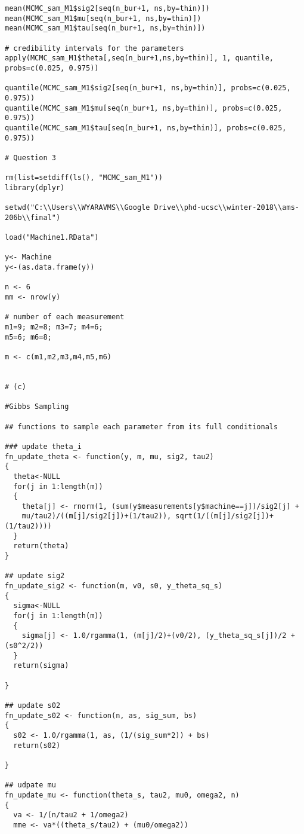 \documentclass[a4paper, 11pt]{article}
\begin{document}
\begin{verbatim}
mean(MCMC_sam_M1$sig2[seq(n_bur+1, ns,by=thin)])
mean(MCMC_sam_M1$mu[seq(n_bur+1, ns,by=thin)])
mean(MCMC_sam_M1$tau[seq(n_bur+1, ns,by=thin)])

# credibility intervals for the parameters
apply(MCMC_sam_M1$theta[,seq(n_bur+1,ns,by=thin)], 1, quantile, probs=c(0.025, 0.975))

quantile(MCMC_sam_M1$sig2[seq(n_bur+1, ns,by=thin)], probs=c(0.025, 0.975))
quantile(MCMC_sam_M1$mu[seq(n_bur+1, ns,by=thin)], probs=c(0.025, 0.975))
quantile(MCMC_sam_M1$tau[seq(n_bur+1, ns,by=thin)], probs=c(0.025, 0.975))

# Question 3

rm(list=setdiff(ls(), "MCMC_sam_M1"))
library(dplyr)

setwd("C:\\Users\\WYARAVMS\\Google Drive\\phd-ucsc\\winter-2018\\ams-206b\\final")

load("Machine1.RData")

y<- Machine
y<-(as.data.frame(y))

n <- 6
mm <- nrow(y)

# number of each measurement
m1=9; m2=8; m3=7; m4=6;
m5=6; m6=8;

m <- c(m1,m2,m3,m4,m5,m6)


# (c)

#Gibbs Sampling

## functions to sample each parameter from its full conditionals

### update theta_i
fn_update_theta <- function(y, m, mu, sig2, tau2)
{
  theta<-NULL
  for(j in 1:length(m))
  {
    theta[j] <- rnorm(1, (sum(y$measurements[y$machine==j])/sig2[j] +
    mu/tau2)/((m[j]/sig2[j])+(1/tau2)), sqrt(1/((m[j]/sig2[j])+(1/tau2))))
  }
  return(theta)
}

## update sig2
fn_update_sig2 <- function(m, v0, s0, y_theta_sq_s)
{
  sigma<-NULL
  for(j in 1:length(m))
  {
    sigma[j] <- 1.0/rgamma(1, (m[j]/2)+(v0/2), (y_theta_sq_s[j])/2 + (s0^2/2)) 
  }
  return(sigma)
  
}

## update s02
fn_update_s02 <- function(n, as, sig_sum, bs)
{
  s02 <- 1.0/rgamma(1, as, (1/(sig_sum*2)) + bs)
  return(s02)
  
}

## udpate mu
fn_update_mu <- function(theta_s, tau2, mu0, omega2, n)
{
  va <- 1/(n/tau2 + 1/omega2)
  mme <- va*((theta_s/tau2) + (mu0/omega2))
  

\end{verbatim}
\end{document}
